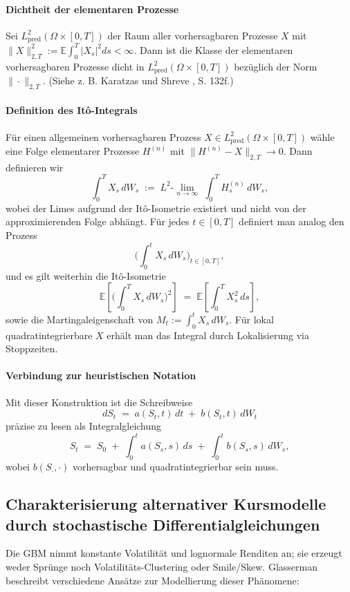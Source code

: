 \paragraph{Dichtheit der elementaren Prozesse}
Sei $L^2_{\mathrm{pred}}(\Omega\times[0,T])$ der Raum aller vorhersagbaren Prozesse $X$ mit
$\|X\|_{2,T}^2 := \mathbb E\!\int_0^T |X_s|^2 ds <\infty$.
Dann ist die Klasse der elementaren vorhersagbaren Prozesse dicht in $L^2_{\mathrm{pred}}(\Omega\times[0,T])$ bezüglich der Norm $\|\cdot\|_{2,T}$. (Siehe z. B. Karatzas und Shreve \cite{karatzas_brownian_1991}, S. 132f.)
\paragraph{Definition des It\^o-Integrals}
Für einen allgemeinen vorhersagbaren Prozess $X\in L^2_{\mathrm{pred}}(\Omega\times[0,T])$ wähle eine Folge elementarer Prozesse $H^{(n)}$ mit
$\|H^{(n)}-X\|_{2,T}\to 0$. Dann definieren wir
$$
\int_0^T X_s\,dW_s \;:=\; L^2\text{-}\lim_{n\to\infty}\;\int_0^T H^{(n)}_s\,dW_s,
$$
wobei der Limes aufgrund der It\^o-Isometrie existiert und nicht von der approximierenden Folge abhängt. Für jedes $t\in[0,T]$ definiert man analog den Prozess
$$
\Big(\int_0^t X_s\,dW_s\Big)_{t\in[0,T]},
$$
und es gilt weiterhin die It\^o-Isometrie
$$
\mathbb E\!\left[\Big(\int_0^T X_s\,dW_s\Big)^{\!2}\right] \;=\; \mathbb E\!\left[\int_0^T X_s^{2}\,ds\right],
$$
sowie die Martingaleigenschaft von $M_t:=\int_0^t X_s\,dW_s$. Für lokal quadratintegrierbare $X$ erhält man das Integral durch Lokalisierung via Stoppzeiten.

\paragraph{Verbindung zur heuristischen Notation}
Mit dieser Konstruktion ist die Schreibweise
$$
dS_t \;=\; a(S_t,t)\,dt \;+\; b(S_t,t)\,dW_t
$$
präzise zu lesen als Integralgleichung
$$
S_t \;=\; S_0 \;+\; \int_0^t a(S_s,s)\,ds \;+\; \int_0^t b(S_s,s)\,dW_s,
$$
wobei $b(S_\cdot,\cdot)$ vorhersagbar und quadratintegrierbar sein muss.


\subsection{Charakterisierung alternativer Kursmodelle durch stochastische Differentialgleichungen}

Die GBM nimmt konstante Volatilität und lognormale Renditen an; sie erzeugt weder Sprünge noch Volatilitäts-Clustering oder Smile/Skew.
Glasserman \cite{glasserman2003monte} beschreibt verschiedene Ansätze zur Modellierung dieser Phänomene:

